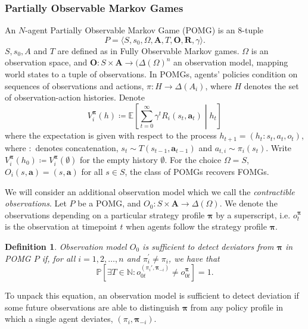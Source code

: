 \documentclass[referee,sn-basic]{sn-jnl}
\newcommand{\E}{\mathbb{E}}
\newcommand{\bpi}{\boldsymbol{\pi}}
\theoremstyle{thmstyleone}%
\theoremstyle{thmstyletwo}%
\theoremstyle{thmstylethree}%
\newtheorem{definition}{Definition}%
\begin{document}
\subsubsection{Partially Observable Markov Games} An $N$-agent Partially Observable Markov Game (POMG) is an 8-tuple 
\[
P = \langle S, s_0, \Omega, \mathbf A, T, \mathbf O, \mathbf R, \gamma \rangle.
\]
$S, s_0, A$ and $T$ are defined as in Fully Observable Markov games. $\Omega$ is an observation space, and $\mathbf{O}: S \times \mathbf A \to (\Delta(\Omega)^n$ an observation model, mapping world states to a tuple of observations. In POMGs, agents' policies condition on sequences of observations and actions, $\pi: H \to \Delta(A_i)$, where $H$ denotes the set of observation-action histories. Denote
\[
V_i^{\boldsymbol\pi}(h) \coloneqq \E\left[\sum_{t=0}^\infty \gamma^t R_i(s_t, \mathbf a_t) \middle\vert h_t\right]
\]
where the expectation is given with respect to the process $h_{t+1} = (h_t: s_t, a_t, o_t)$, where $:$ denotes concatenation, $s_t \sim T(s_{t-1}, \mathbf{a}_{t-1})$ and $a_{t, i} \sim \pi_i(s_t)$. Write $V_i^{\boldsymbol{\pi}}(h_0) \coloneqq V_i^{\boldsymbol{\pi}}(\emptyset)$ for the empty history $\emptyset$. For the choice $\Omega = S$, $O_i (s,\mathbf a) = (s,\mathbf a)$ for all $s \in S$, the class of POMGs recovers FOMGs.

We will consider an additional observation model which we call the \emph{contractible observations}. Let $P$ be a POMG, and $O_0: S \times \mathbf A \to \Delta(\Omega)$. We denote the observations depending on a particular strategy profile $\bpi$ by a superscript, i.e. $o_t^{\bpi}$ is the observation at timepoint $t$ when agents follow the strategy profile $\bpi$. 

\begin{definition}
    Observation model $O_0$ is \textit{sufficient to detect deviators from $\boldsymbol{\pi}$} in POMG $P$ if, for all $i=1, 2, \dots, n$ and $\pi_i^\prime \ne {\pi}_i$, we have that 
    \[
    \mathbb{P}\left[\exists T \in \mathbb{N}: o_{0t}^{(\pi_i', \bpi_{-i})} \neq o_{0t}^{\bpi}\right] = 1.
    \]
\end{definition}
To unpack this equation, an observation model is sufficient to detect deviation if some future observations are able to distinguish $\bpi$ from any policy profile in which a single agent deviates, $(\pi_i, \boldsymbol{\pi}_{-i})$.
\end{document}
